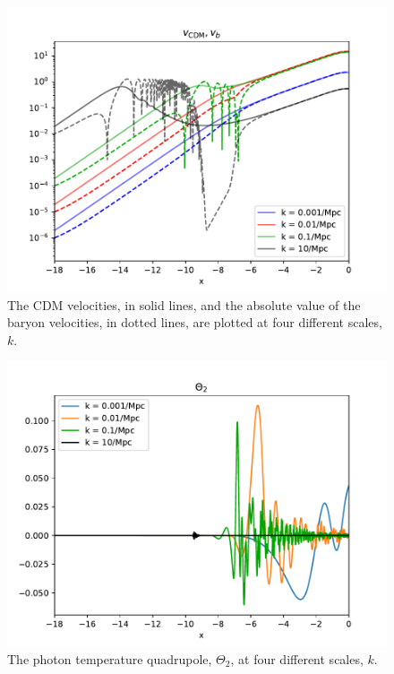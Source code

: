 \documentclass{aa}
\begin{document}
\begin{figure}[h!]
   \includegraphics[scale=0.6]{../figures/milestone3/v_cdm_v_b.pdf}
   \caption{The CDM velocities, in solid lines, and the absolute value of the baryon velocities,
   in dotted lines, are plotted at four different scales, $k$.}\label{fig:v_cdm_v_b}
\end{figure}

\begin{figure}[h!]
   \includegraphics[scale=0.65]{../figures/milestone3/theta_2.pdf}
   \caption{The photon temperature quadrupole, $\Theta_2$, at four different scales, $k$.}\label{fig:theta2}
\end{figure}
\end{document}
